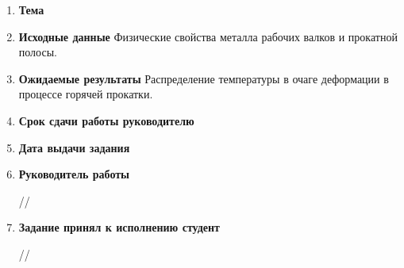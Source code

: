 \begin{enumerate}
	\item \textbf{Тема} \thema
	
	
	\item \textbf{Исходные данные} Физические свойства металла рабочих валков и прокатной полосы.
	
	\item \textbf{Ожидаемые результаты} Распределение температуры в очаге деформации в процессе горячей прокатки.
	
	\item \textbf{Срок сдачи работы руководителю} \hspace{1cm} \datasdachi
	
		
	\item \textbf{Дата выдачи задания} \hspace{1cm}  \datavydachi
	
	\item \textbf{Руководитель работы}
		\begin{flushright}
			\underline{\hspace{4cm}} /\adviser/
		\end{flushright}
		
	\item \textbf{Задание принял к исполнению студент}
		\begin{flushright}
			\underline{\hspace{4cm}} /\student/
		\end{flushright}	
\end{enumerate}			
	
	